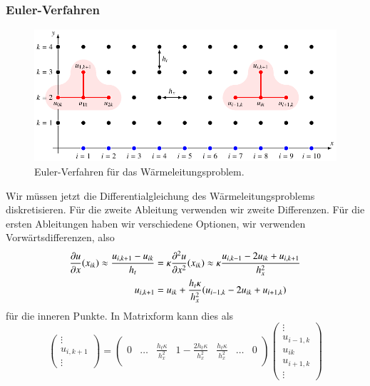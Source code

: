 \subsubsection{Euler-Verfahren}
\begin{figure}
\centering
\includegraphics{chapters/70-pde/images/euler.pdf}
\caption{Euler-Verfahren für das Wärmeleitungsproblem.
\label{buch:pde:figure:euler}}
\end{figure}
Wir müssen jetzt die Differentialgleichung des Wärmeleitungsproblems
diskretisieren.
Für die zweite Ableitung verwenden wir zweite Differenzen.
Für die ersten Ableitungen haben wir verschiedene Optionen, wir
verwenden Vorwärtsdifferenzen, also
\begin{align}
\frac{\partial u}{\partial x}(x_{ik})
\approx
\frac{u_{i,k+1}-u_{ik}}{h_t}
&=
\kappa
\frac{\partial^2u}{\partial x^2}(x_{ik})
\approx
\kappa
\frac{u_{i,k-1}-2u_{ik}+u_{i,k+1}}{h_x^2}
\notag
\\
u_{i,k+1}
&=
u_{ik} + \frac{h_t\kappa}{h_x^2} (u_{i-1,k}-2u_{ik}+u_{i+1,k})
\label{buch:pde:waerme:euler}
\end{align}
für die inneren Punkte.
In Matrixform kann dies als
\[
\begin{pmatrix}
\vdots\\
u_{i,k+1}\\
\vdots
\end{pmatrix}
=
\begin{pmatrix}
&&&&\\
0&\dots
	&\displaystyle\frac{h_t\kappa}{h_x^2}
		&\displaystyle1-\frac{2h_t\kappa}{h_x^2}
			&\displaystyle\frac{h_t\kappa}{h_x^2}
				&\dots
					&0\\
&&&&
\end{pmatrix}
\begin{pmatrix}
\vdots\\
u_{i-1,k}\\
u_{ik}\\
u_{i+1,k}\\
\vdots
\end{pmatrix}
\]
